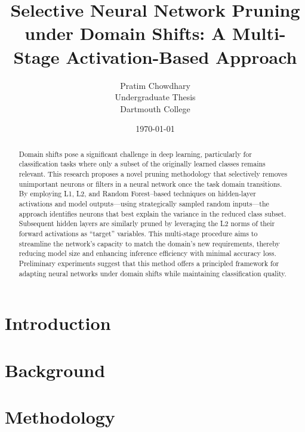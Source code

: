 \documentclass[12pt]{article}
\begin{document}
\title{Selective Neural Network Pruning under Domain Shifts: A Multi-Stage Activation-Based Approach}
\author{Pratim Chowdhary \\
Undergraduate Thesis \\
Dartmouth College}
\date{\today}
\maketitle

\begin{abstract}
Domain shifts pose a significant challenge in deep learning, particularly for classification tasks where only a subset of the originally 
learned classes remains relevant. This research proposes a novel pruning methodology that selectively removes unimportant neurons 
or filters in a neural network once the task domain transitions. By employing L1, L2, and Random Forest–based techniques on hidden-layer 
activations and model outputs—using strategically sampled random inputs—the approach identifies neurons that best explain the 
variance in the reduced class subset. Subsequent hidden layers are similarly pruned by leveraging the L2 norms of their forward 
activations as “target” variables. This multi-stage procedure aims to streamline the network’s capacity to match the domain’s new 
requirements, thereby reducing model size and enhancing inference efficiency with minimal accuracy loss. Preliminary experiments 
suggest that this method offers a principled framework for adapting neural networks under domain shifts while maintaining classification quality.


\end{abstract}

\tableofcontents

\section{Introduction}


\section{Background}

\section{Methodology}
\end{document}
